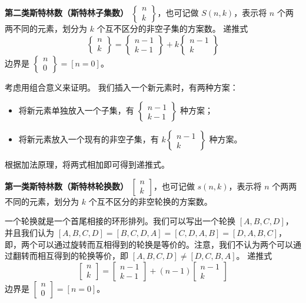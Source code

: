 
\textbf{第二类斯特林数（斯特林子集数）}
$\begin{Bmatrix}n\\ k\end{Bmatrix}$，也可记做 $S(n,k)$，表示将 $n$ 个两两不同的元素，划分为 $k$ 个互不区分的非空子集的方案数。
递推式
$$\begin{Bmatrix}n\\ k\end{Bmatrix}=\begin{Bmatrix}n-1\\ k-1\end{Bmatrix}+k\begin{Bmatrix}n-1\\ k\end{Bmatrix}$$
边界是
$\begin{Bmatrix}n\\ 0\end{Bmatrix}=[n=0]。$

考虑用组合意义来证明。
我们插入一个新元素时，有两种方案：
\begin{itemize}
    \item 将新元素单独放入一个子集，有 $\begin{Bmatrix}n-1\\ k-1\end{Bmatrix}$ 种方案；
    \item 将新元素放入一个现有的非空子集，有 $k\begin{Bmatrix}n-1\\ k\end{Bmatrix}$ 种方案。
\end{itemize}
根据加法原理，将两式相加即可得到递推式。

\textbf{第一类斯特林数（斯特林轮换数） }
$\begin{bmatrix}n\\ k\end{bmatrix}$，也可记做 $s(n,k)$，表示将 $n$ 个两两不同的元素，划分为 $k$ 个互不区分的非空轮换的方案数。

一个轮换就是一个首尾相接的环形排列。我们可以写出一个轮换 $[A,B,C,D]$，并且我们认为 $[A,B,C,D]=[B,C,D,A]=[C,D,A,B]=[D,A,B,C]$，即，两个可以通过旋转而互相得到的轮换是等价的。注意，我们不认为两个可以通过翻转而相互得到的轮换等价，即 $[A,B,C,D]\neq[D,C,B,A]$。
递推式
$$\begin{bmatrix}n\\ k\end{bmatrix}=\begin{bmatrix}n-1\\ k-1\end{bmatrix}+(n-1)\begin{bmatrix}n-1\\ k\end{bmatrix}$$
边界是
$\begin{bmatrix}n\\ 0\end{bmatrix}=[n = 0]$。

